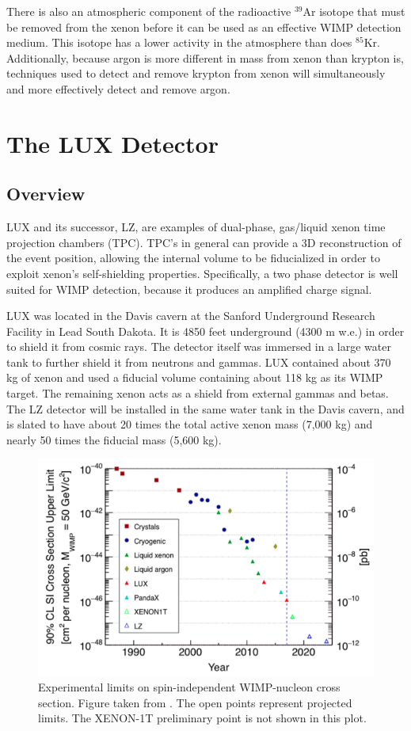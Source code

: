 There is also an atmospheric component of the radioactive $^{39}$Ar isotope that must be removed from the xenon before it can be used as an effective WIMP detection medium. This isotope has a lower activity in the atmosphere than does $^{85}$Kr. Additionally, because argon is more different in mass from xenon than krypton is, techniques used to detect and remove krypton from xenon will simultaneously and more effectively detect and remove argon.

\section{The LUX Detector}
\subsection{Overview}
LUX and its successor, LZ, are examples of dual-phase, gas/liquid xenon time projection chambers (TPC). TPC's in general can provide a 3D reconstruction of the event position, allowing the internal volume to be fiducialized in order to exploit xenon's self-shielding properties. Specifically, a two phase detector is well suited for WIMP detection, because it produces an amplified charge signal. 

LUX was located in the Davis cavern at the Sanford Underground Research Facility in Lead South Dakota. It is 4850 feet underground (4300 m w.e.) in order to shield it from cosmic rays. The detector itself was immersed in a large water tank to further shield it from neutrons and gammas. LUX contained about 370 kg of xenon and used a fiducial volume containing about 118 kg as its WIMP target. The remaining xenon acts as a shield from external gammas and betas. The LZ detector will be installed in the same water tank in the Davis cavern, and is slated to have about 20 times the total active xenon mass (7,000 kg) and nearly 50 times the fiducial mass (5,600 kg).
\begin{figure}[h!]
\centering
\includegraphics[width=\linewidth]{Figures/limits_trend.png}
\caption{Experimental limits on spin-independent WIMP-nucleon cross section. Figure taken from \cite{lz_tdr}. The open points represent projected limits. The XENON-1T preliminary point is not shown in this plot.}
\label{fig:limits_trend} 
\end{figure}

